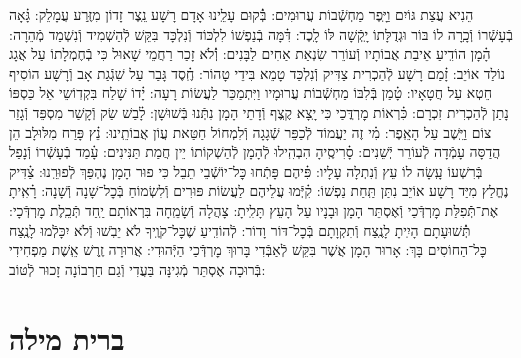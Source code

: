\documentclass[twoside, openany, parskip=half, 11pt]{book}
\begin{document}
הֵנִיא עֲצַת גּוֹיִם וַיָּֽפֶר מַחְשְֿׁבוֹת עֲרוּמִים: \hfill \break
בְּֿ֗קוּם עָלֵֽינוּ אָדָם רָשָׁע נֵֽצֶר זָדוֹן מִזֶּֽרַע עֲמָלֵק: \hfill \break
גָּ֗אָה בְֿעָשְֿׁרוֹ וְֿכָֽרָה לוֹ בּוֹר וּגְדֻלָּתוֹ יָֽקְֿשָׁה לּוֹ לָֽכֶד: \hfill \break
דִּ֗מָּה בְֿנַפְשׁוֹ לִלְכּוֹד וְֿנִלְכָּד בִּקֵּשׁ לְֿהַשְׁמִיד וְֿנִשְׁמַד מְֿהֵרָה: \hfill \break
הָ֗מָן הוֹדִֽיעַ אֵיבַת אֲבוֹתָיו וְֿעוֹרֵר שִׂנְאַת אַחִים לַבָּנִים: \hfill \break
וְֿ֗לֹא זָכַר רַחֲמֵי שָׁאוּל כִּי בְֿחֶמְלָתוֹ עַל אֲגָג נוֹלַד אוֹיֵב: \hfill \break
זָ֗מַם רָשָׁע לְֿהַכְרִית צַדִּיק וְֿנִלְכַּד טָמֵא בִּידֵי טָהוֹר: \hfill \break
חֶֽ֗סֶד גָּבַר עַל שִׁגְֿגַת אָב וְֿרָשָׁע הוֹסִיף חֵטְא עַל חֲטָאָיו: \hfill \break
טָ֗מַן בְּֿלִבּוֹ מַחְשְֿׁבוֹת עֲרוּמָיו וַיִּתְמַכֵּר לַעֲשׂוֹת רָעָה: \hfill \break
יָ֗דוֹ שָׁלַח בִּקְדֽוֹשֵי אֵל כַּסְפּוֹ נָתַן לְֿהַכְרִית זִכְרָם: \hfill \break
כִּ֗רְאוֹת מׇרְדֳּכַי כִּי יָֽצָא קֶֽצֶף וְֿדָתֵי הָמָן נִתְּֿנוּ בְּֿשׁוּשָׁן: \hfill \break
לָ֗בַשׁ שַׂק וְֿקָשַׁר מִסְפֵּד וְֿגָזַר צוֹם וַיֵּֽשֶׁב עַל הָאֵֽפֶר: \hfill \break
מִ֗י זֶה יַעֲמוֹד לְֿכַפֵּר שְֿׁגָגָה וְֿלִמְחוֹל חַטַּאת עֲוֹן אֲבוֹתֵֽינוּ: \hfill \break
נֵ֗ץ פָּרַח מִלּוּלָב הֵן הֲדַסָּה עָמְֿדָה לְֿעוֹרֵר יְֿשֵׁנִים: \hfill \break
סָ֗רִיסֶֽיהָ הִבְהִֽילוּ לְֿהָמָן לְֿהַשְׁקוֹתוֹ יֵין חֲמַת תַּנִּינִים: \hfill \break
עָ֗מַד בְֿעָשְֿׁרוֹ וְֿנָפַל בְּֿרִשְׁעוֹ עָֽשָׂה לוֹ עֵץ וְֿנִתְלָה עָלָיו: \hfill \break
פִּ֗יהֶם פָּתְֿחוּ כׇּל־יוֹשְֿׁבֵי תֵבֵל כִּי פוּר הָמָן נֶהְפַּךְ לְֿפוּרֵֽנוּ: \hfill \break
צַ֗דִּיק נֶחֱלַץ מִיַּד רָשָׁע אוֹיֵב נִתַּן תַּֽחַת נַפְשׁוֹ: \hfill \break
קִ֗יְּֿמוּ עֲלֵיהֶם לַעֲשׂוֹת פּוּרִים וְֿלִשְׂמוֹחַ בְּֿכׇל־שָׁנָה וְֿשָׁנָה: \hfill \break
רָ֗אִֽיתָ אֶת־תְּֿֿפִלַּת מׇרְדְּֿכַי וְֿאֶסְתֵּר הָמָן וּבָנָיו עַל הָעֵץ תָּלִֽיתָ: \hfill \break
{}
צָהֲלָה וְֿשָׂמֵֽחָה בִּרְאוֹתָם יַֽחַד תְּֿכֵֽלֶת מׇרְדְּֿכָי: \hfill \break
תְּֿ֗שׁוּעָתָם הָיִֽיתָ לָנֶֽצַח וְֿתִקְוָתָם בְּֿכׇל־דּוֹר וָדוֹר: \hfill \break
לְֿהוֹדִֽיעַ שֶׁכׇּל־קֹוֶֽיךָ לֹא יֵבֹֽשׁוּ וְֿלֹא יִכָּלְֿמוּ לָנֶֽצַח כׇּל־הַחוֹסִים בָּךְ: \hfill \break
אָרוּר הָמָן אֲשֶׁר בִּקֵּשׁ לְֿאַבְּֿדִי בָּרוּךְ מׇרְדְּֿכַי הַיְּֿהוּדִי: \hfill \break
אֲרוּרָה זֶֽרֶשׁ אֵֽשֶׁת מַפְחִידִי בְּֿרוּכָה אֶסְתֵּר מְֿגִינָּה בַּעֲדִי וְֿגַם חַרְבוֹנָה זָכוּר לְֿטּוֹב:

\vfill


\sepline



\chapter[ברית מילה]{ ברית מילה }
\end{document}
